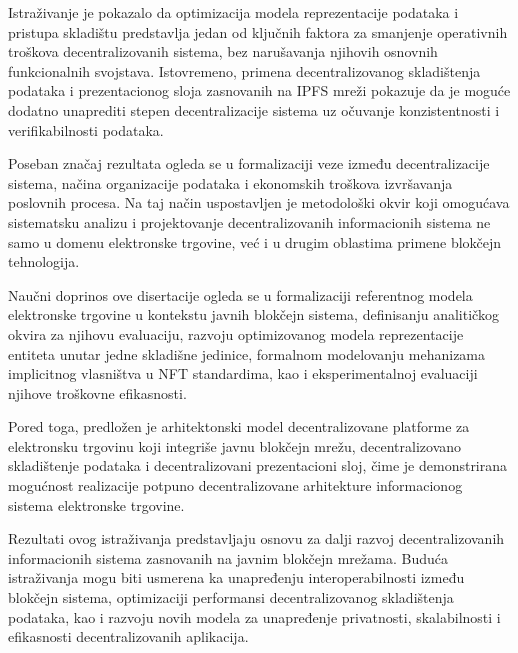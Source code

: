 Istraživanje je pokazalo da optimizacija modela reprezentacije podataka i pristupa skladištu predstavlja jedan od ključnih faktora za smanjenje operativnih troškova decentralizovanih sistema, bez narušavanja njihovih osnovnih funkcionalnih svojstava. Istovremeno, primena decentralizovanog skladištenja podataka i prezentacionog sloja zasnovanih na IPFS mreži pokazuje da je moguće dodatno unaprediti stepen decentralizacije sistema uz očuvanje konzistentnosti i verifikabilnosti podataka.

Poseban značaj rezultata ogleda se u formalizaciji veze između decentralizacije sistema, načina organizacije podataka i ekonomskih troškova izvršavanja poslovnih procesa. Na taj način uspostavljen je metodološki okvir koji omogućava sistematsku analizu i projektovanje decentralizovanih informacionih sistema ne samo u domenu elektronske trgovine, već i u drugim oblastima primene blokčejn tehnologija.

Naučni doprinos ove disertacije ogleda se u formalizaciji referentnog modela elektronske trgovine u kontekstu javnih blokčejn sistema, definisanju analitičkog okvira za njihovu evaluaciju, razvoju optimizovanog modela reprezentacije entiteta unutar jedne skladišne jedinice, formalnom modelovanju mehanizama implicitnog vlasništva u NFT standardima, kao i eksperimentalnoj evaluaciji njihove troškovne efikasnosti.

Pored toga, predložen je arhitektonski model decentralizovane platforme za elektronsku trgovinu koji integriše javnu blokčejn mrežu, decentralizovano skladištenje podataka i decentralizovani prezentacioni sloj, čime je demonstrirana mogućnost realizacije potpuno decentralizovane arhitekture informacionog sistema elektronske trgovine.

Rezultati ovog istraživanja predstavljaju osnovu za dalji razvoj decentralizovanih informacionih sistema zasnovanih na javnim blokčejn mrežama. Buduća istraživanja mogu biti usmerena ka unapređenju interoperabilnosti između blokčejn sistema, optimizaciji performansi decentralizovanog skladištenja podataka, kao i razvoju novih modela za unapređenje privatnosti, skalabilnosti i efikasnosti decentralizovanih aplikacija.